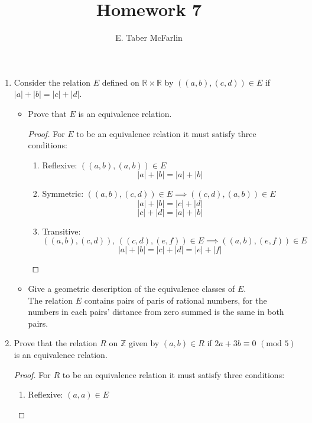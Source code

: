 \documentclass[12pt,a4paper,reqno,parskip=full]{amsart}
\numberwithin{equation}{section}
\theoremstyle{plain}
\theoremstyle{definition}
\begin{document}
\title{Homework 7}

\author{E. Taber McFarlin}

\maketitle

\begin{enumerate}
  \item Consider the relation $E$ defined on $\mathbb{R} \times\mathbb{R}$ by
        $\left((a,b),(c,d)\right)\in E$ if $|a|+|b| = |c|+|d|$.
        \begin{itemize}
          \item Prove that $E$ is an equivalence relation.
                \begin{proof}
                  For $E$ to be an equivalence relation it must satisfy three conditions:
                  \begin{enumerate}[i]
                    \item Reflexive: $((a,b), (a,b))\in E$
                          \[|a| + |b| = |a| + |b|\]
                    \item Symmetric: $((a,b), (c,d))\in E \implies ((c,d), (a,b))\in E$
                          \[|a| + |b| = |c| + |d|\]
                          \[|c| + |d| = |a| + |b|\]
                    \item Transitive:
                          $((a,b), (c,d)),\,((c,d), (e,f))\in E \implies ((a,b), (e,f))\in E$
                          \[|a| + |b| = |c| + |d| = |e| + |f|\]
                  \end{enumerate}
                \end{proof}
          \item Give a geometric description of the equivalence classes of $E$. \\
                The relation $E$ contains pairs of paris of rational numbers, for the numbers in
                each pairs' distance from zero summed is the same in both pairs.
        \end{itemize}
  \item Prove that the relation $R$ on $\mathbb{Z}$ given by
        $(a,b)\in R$ if $2a+3b\equiv0\,\,(\text{mod}\,\,5)$ is an equivalence relation.
        \begin{proof}
          For $R$ to be an equivalence relation it must satisfy three conditions:
          \begin{enumerate}[i]
            \item Reflexive: $(a,a)\in E$

\end{enumerate}
\end{proof}
\end{enumerate}
\end{document}

